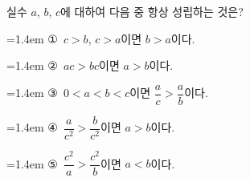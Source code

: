 실수 $a$, $b$, $c$에 대하여 다음 중 항상 성립하는 것은?
\par\medskip\par\noindent\hangindent=1.4em {\small ①}\ $c>b$, $c>a$이면 $b>a$이다.\par\noindent\hangindent=1.4em {\small ②}\ $ac>bc$이면 $a>b$이다.\par\noindent\hangindent=1.4em {\small ③}\ $0<a<b<c$이면 $\dfrac{a}{c}>\dfrac{a}{b}$이다.\par\noindent\hangindent=1.4em {\small ④}\ $\dfrac{a}{c^2}>\dfrac{b}{c^2}$이면 $a>b$이다. \par\noindent\hangindent=1.4em {\small ⑤}\ $\dfrac{c^2}{a}>\dfrac{c^2}{b}$이면 $a<b$이다. \par\medskip
